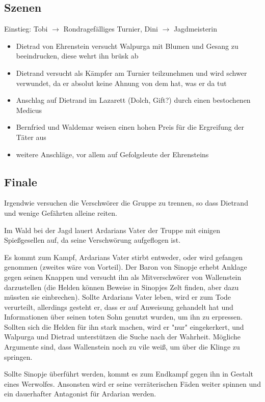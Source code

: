 \subsection{Szenen}

Einstieg: Tobi $\to$ Rondragefälliges Turnier, Dini $\to$ Jagdmeisterin

\begin{itemize}
	\item Dietrad von Ehrenstein versucht Walpurga mit Blumen und Gesang zu beeindrucken, diese wehrt ihn brüsk ab
	\item Dietrand versucht als Kämpfer am Turnier teilzunehmen und wird schwer verwundet, da er absolut keine Ahnung von dem hat, was er da tut
	\item Anschlag auf Dietrand im Lazarett (Dolch, Gift?) durch einen bestochenen Medicus
	\item Bernfried und Waldemar weisen einen hohen Preis für die Ergreifung der Täter aus
	\item weitere Anschläge, vor allem auf Gefolgsleute der Ehrensteins
\end{itemize}

\subsection{Finale}
Irgendwie versuchen die Verschwörer die Gruppe zu trennen, so dass Dietrand und wenige Gefährten alleine reiten.

Im Wald bei der Jagd lauert Ardarians Vater der Truppe mit einigen Spießgesellen auf, da seine Verschwörung aufgeflogen ist.

Es kommt zum Kampf, Ardarians Vater stirbt entweder, oder wird gefangen genommen (zweites wäre von Vorteil).
Der Baron von Sinopje erhebt Anklage gegen seinen Knappen und versucht ihn als Mitverschwörer von Wallenstein darzustellen (die Helden können Beweise in Sinopjes Zelt finden, aber dazu müssten sie einbrechen). 
Sollte Ardarians Vater leben, wird er zum Tode verurteilt, allerdings gesteht er, dass er auf Anweisung gehandelt hat und Informationen über seinen toten Sohn genutzt wurden, um ihn zu erpressen. Sollten sich die Helden für ihn stark machen, wird er "nur" eingekerkert, und Walpurga und Dietrad unterstützen die Suche nach der Wahrheit. Mögliche Argumente sind, dass Wallenstein noch zu vile weiß, um über die Klinge zu springen.

Sollte Sinopje überführt werden, kommt es zum Endkampf gegen ihn in Gestalt eines Werwolfes. Ansonsten wird er seine verräterischen Fäden weiter spinnen und ein dauerhafter Antagonist für Ardarian werden.


